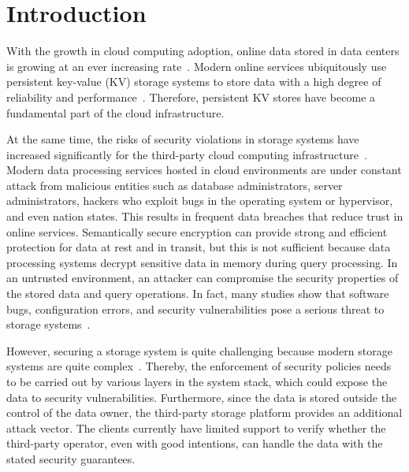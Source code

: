 \section{Introduction}
With the growth in cloud computing adoption, online data stored in data centers is growing at an ever increasing rate~\cite{bhatotia2012shredder}. Modern online services ubiquitously use persistent key-value (KV) storage systems to store data with a high degree of reliability and performance~\cite{bailleu2019speicher}. Therefore, persistent KV stores have become a fundamental part of the cloud infrastructure.

At the same time, the risks of security violations in storage systems have increased significantly for the third-party cloud computing infrastructure~\cite{santos2009towards}. Modern data processing services hosted in cloud environments are under constant attack from malicious entities such as database administrators, server administrators, hackers who exploit bugs in the operating system or hypervisor, and even nation states. This results in frequent data breaches that reduce trust in online services. Semantically secure encryption can provide strong and efficient protection for data at rest and in transit, but this is not sufficient because data processing systems decrypt sensitive data in memory during query processing. In an untrusted environment, an attacker can compromise the security properties of the stored data and query operations. In fact, many studies show that software bugs, configuration errors, and security vulnerabilities pose a serious threat to storage systems~\cite{gunawi2014bugs}.

However, securing a storage system is quite challenging because modern storage systems are quite complex~\cite{lu2013study}. Thereby, the enforcement of security policies needs to be carried out by various layers in the system stack, which could expose the data to security vulnerabilities. Furthermore, since the data is stored outside the control of the data owner, the third-party storage platform provides an additional attack vector. The clients currently have limited support to verify whether the third-party operator, even with good intentions, can handle the data with the stated security guarantees.

